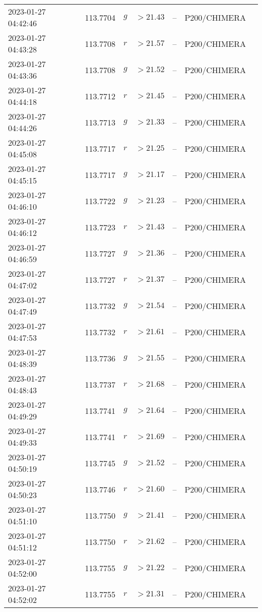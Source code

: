 \documentclass{nature_plusfigure}
\begin{document}
\begin{supplement}
\begin{center}
\begin{longtable}{lllllll}
2023-01-27 04:42:46 & 113.7704 & $g$ & $>21.43$ & -- & P200/CHIMERA &  \\ 
2023-01-27 04:43:28 & 113.7708 & $r$ & $>21.57$ & -- & P200/CHIMERA &  \\ 
2023-01-27 04:43:36 & 113.7708 & $g$ & $>21.52$ & -- & P200/CHIMERA &  \\ 
2023-01-27 04:44:18 & 113.7712 & $r$ & $>21.45$ & -- & P200/CHIMERA &  \\ 
2023-01-27 04:44:26 & 113.7713 & $g$ & $>21.33$ & -- & P200/CHIMERA &  \\ 
2023-01-27 04:45:08 & 113.7717 & $r$ & $>21.25$ & -- & P200/CHIMERA &  \\ 
2023-01-27 04:45:15 & 113.7717 & $g$ & $>21.17$ & -- & P200/CHIMERA &  \\ 
2023-01-27 04:46:10 & 113.7722 & $g$ & $>21.23$ & -- & P200/CHIMERA &  \\ 
2023-01-27 04:46:12 & 113.7723 & $r$ & $>21.43$ & -- & P200/CHIMERA &  \\ 
2023-01-27 04:46:59 & 113.7727 & $g$ & $>21.36$ & -- & P200/CHIMERA &  \\ 
2023-01-27 04:47:02 & 113.7727 & $r$ & $>21.37$ & -- & P200/CHIMERA &  \\ 
2023-01-27 04:47:49 & 113.7732 & $g$ & $>21.54$ & -- & P200/CHIMERA &  \\ 
2023-01-27 04:47:53 & 113.7732 & $r$ & $>21.61$ & -- & P200/CHIMERA &  \\ 
2023-01-27 04:48:39 & 113.7736 & $g$ & $>21.55$ & -- & P200/CHIMERA &  \\ 
2023-01-27 04:48:43 & 113.7737 & $r$ & $>21.68$ & -- & P200/CHIMERA &  \\ 
2023-01-27 04:49:29 & 113.7741 & $g$ & $>21.64$ & -- & P200/CHIMERA &  \\ 
2023-01-27 04:49:33 & 113.7741 & $r$ & $>21.69$ & -- & P200/CHIMERA &  \\ 
2023-01-27 04:50:19 & 113.7745 & $g$ & $>21.52$ & -- & P200/CHIMERA &  \\ 
2023-01-27 04:50:23 & 113.7746 & $r$ & $>21.60$ & -- & P200/CHIMERA &  \\ 
2023-01-27 04:51:10 & 113.7750 & $g$ & $>21.41$ & -- & P200/CHIMERA &  \\ 
2023-01-27 04:51:12 & 113.7750 & $r$ & $>21.62$ & -- & P200/CHIMERA &  \\ 
2023-01-27 04:52:00 & 113.7755 & $g$ & $>21.22$ & -- & P200/CHIMERA &  \\ 
2023-01-27 04:52:02 & 113.7755 & $r$ & $>21.31$ & -- & P200/CHIMERA &  \\ 

\end{longtable}
\end{center}
\end{supplement}
\end{document}
